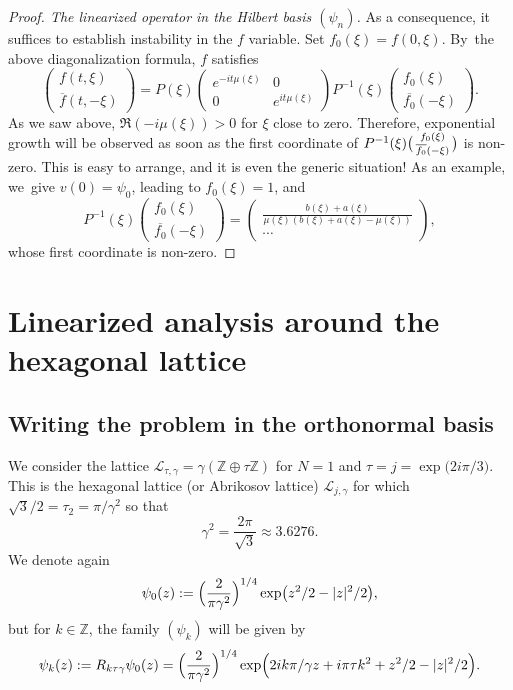 \documentclass[10pt]{amsart}
\newenvironment{smallpmatrix}{\bigl(\begin{smallmatrix}}{\end{smallmatrix}\bigr)}
\theoremstyle{definition}
\let\EE\exp
\newcommand\Z{\mathbb Z}
\begin{document}
\begin{proof}[Proof. The linearized operator in the Hilbert basis $(\psi_n)$]
As a consequence, it suffices to establish instability in the $ {f}$ variable. Set $f_0(\xi)=f(0,\xi)$. By~the above diagonalization formula, $ {f}$ satisfies
\[
\begin{pmatrix} {f}(t,\xi) \\[2pt] \overline{{f}}(t,-\xi) \end{pmatrix} = P(\xi) \begin{pmatrix} e^{-i t \mu(\xi)} & 0 \\[2pt] 0 & e^{i t \mu(\xi)}\end{pmatrix} P^{-1}(\xi) \begin{pmatrix} {f}_0(\xi) \\[2pt] \overline{{f}_0}(-\xi) \end{pmatrix}.
\]
As we saw above, $\Re (-i \mu(\xi)) > 0$ for $\xi$ close to zero. Therefore, exponential growth will be observed as soon as the first coordinate of $P^{-1}(\xi) \begin{smallpmatrix} {f}_0(\xi) \\\overline{{f}_0}(-\xi) \end{smallpmatrix}$ is non-zero. This is easy to arrange, and it is even the generic situation! As an example, we~give $v(0) = \psi_0$, leading to $ {f}_0(\xi) = 1$, and
\[
P^{-1}(\xi) \begin{pmatrix} {f}_0(\xi) \\[2pt] \overline{{f}_0}(-\xi) \end{pmatrix} = \begin{pmatrix}\frac{b(\xi)+a(\xi)}{\mu(\xi)(b(\xi)+a(\xi)-\mu(\xi))} \\[2pt] \cdots \end{pmatrix},
\]
whose first coordinate is non-zero.
\end{proof}

\section{Linearized analysis around the hexagonal lattice}\label{Sect6}
\label{section5}

\subsection{Writing the problem in the orthonormal basis}

\label{subsect6.1}

We consider the lattice $\mathcal{L}_{\tau,\gamma} = \gamma(\Z \oplus \tau \Z)$ for $N=1$ and $\tau = j = \EE\bigl({{2i\pi}/{3}}\bigr)$. This is the hexagonal lattice (or Abrikosov lattice) $\mathcal{L}_{j,\gamma}$ for which ${\sqrt{3}}/{2} = \tau_2 = {\pi}/{\gamma^2}$ so that
\[
\gamma^2 = \frac{2\pi}{\sqrt{3}} \approx 3.6276.
\]
We denote again
\[
\psi_0(z):=\Bigl(\frac{2}{\pi \gamma^2}\Bigr)^{1/4}\EE\bigl({z^2/2-|z|^2/2}\bigr),
\]
but for $k\in \Z$, the family $(\psi_k)$ will be given by
\begin{equation}\label{newdef}
\psi_k(z):=R_{k\tau \gamma}\psi_0(z)=\Bigl(\frac{2}{\pi \gamma^2}\Bigr)^{1/4}\EE\Bigl({{2ik\pi}/ {\gamma} z+i\pi \tau k^2+ z^2/2-|z|^2/2}\Bigr).
\end{equation}
\end{document}
